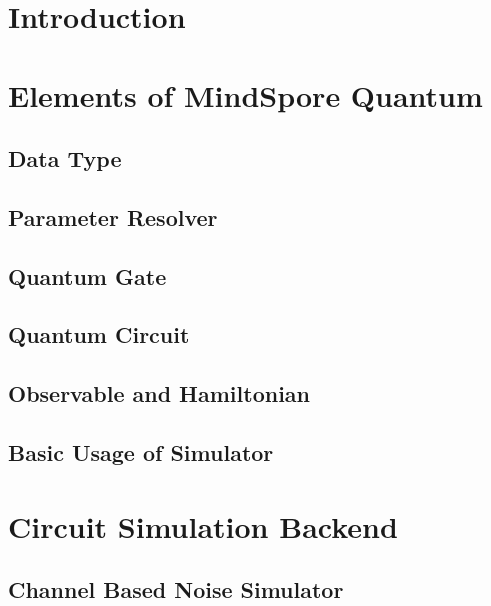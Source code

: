 \documentclass[pra,twocolumn,superscriptaddress,floatfix,nofootinbib,amsmath,amssymb]{revtex4-1}
\numberwithin{equation}{section}
\numberwithin{figure}{section}
\numberwithin{table}{section}
\begin{document}
\section{Introduction}



\section{Elements of MindSpore Quantum}
\label{sec:elements}

\subsection{Data Type}


\subsection{Parameter Resolver}


\subsection{Quantum Gate}


\subsection{Quantum Circuit}


\subsection{Observable and Hamiltonian}


\subsection{Basic Usage of Simulator}
\label{sec:sim_basic_usage}



\section{Circuit Simulation Backend}
\label{sec:backend}



\subsection{Channel Based Noise Simulator}

\end{document}
